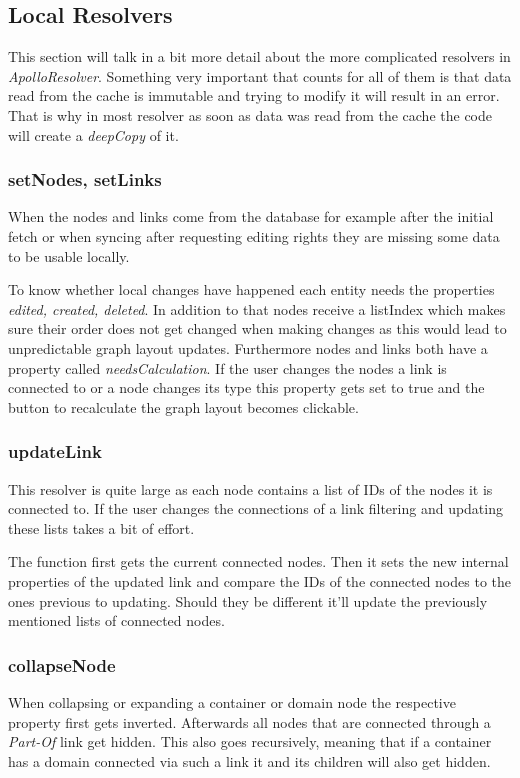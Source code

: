 \subsection{Local Resolvers}
This section will talk in a bit more detail about the more complicated resolvers in \emph{ApolloResolver}. Something very important that counts for all of them is that data read from the cache is immutable and trying to modify it will result in an error. That is why in most resolver as soon as data was read from the cache the code will create a \emph{deepCopy} of it.

\subsubsection{setNodes, setLinks}
When the nodes and links come from the database for example after the initial fetch or when syncing after requesting editing rights they are missing some data to be usable locally.

To know whether local changes have happened each entity needs the properties \emph{edited, created, deleted}. In addition to that nodes receive a listIndex which makes sure their order does not get changed when making changes as this would lead to unpredictable graph layout updates. Furthermore nodes and links both have a property called \emph{needsCalculation}. If the user changes the nodes a link is connected to or a node changes its type this property gets set to true and the button to recalculate the graph layout becomes clickable.

\subsubsection{updateLink}
This resolver is quite large as each node contains a list of IDs of the nodes it is connected to. If the user changes the connections of a link filtering and updating these lists takes a bit of effort.

The function first gets the current connected nodes. Then it sets the new internal properties of the updated link and compare the IDs of the connected nodes to the ones previous to updating. Should they be different it'll update the previously mentioned lists of connected nodes.

\subsubsection{collapseNode}
When collapsing or expanding a container or domain node the respective property first gets inverted. Afterwards all nodes that are connected through a \emph{Part-Of} link get hidden. This also goes recursively, meaning that if a container has a domain connected via such a link it and its children will also get hidden.

